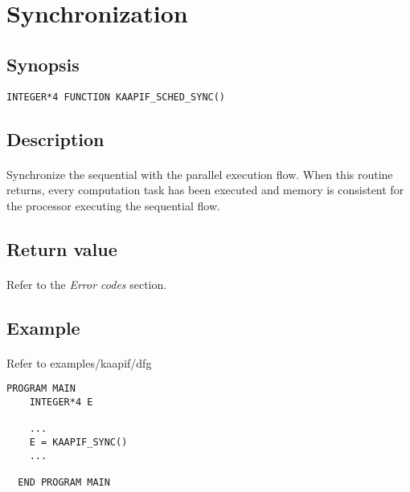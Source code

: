 \documentclass[a4paper, 11pt]{article}
\begin{document}
\newpage
\section{Synchronization}

\subsection{Synopsis}
\begin{small}
\lstset{language=C}
\begin{lstlisting}[frame=tb]
INTEGER*4 FUNCTION KAAPIF_SCHED_SYNC()
\end{lstlisting}
\end{small}

\subsection{Description}
\paragraph{}
Synchronize the sequential with the parallel execution flow. When this routine
returns, every computation task has been executed and memory is consistent for
the processor executing the sequential flow.

\subsection{Return value}
\paragraph{}
Refer to the \textit{Error codes} section.

\subsection{Example}
\paragraph{}
Refer to examples/kaapif/dfg\\
\begin{small}
\begin{lstlisting}[frame=tb]
  PROGRAM MAIN
    INTEGER*4 E

    ...
    E = KAAPIF_SYNC()
    ...

  END PROGRAM MAIN
\end{lstlisting}
\end{small}
\end{document}
